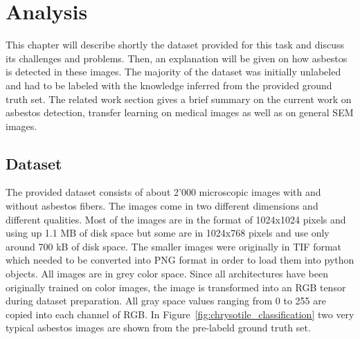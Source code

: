 \chapter{Analysis}

This chapter will describe shortly the dataset provided for this task and discuss its challenges and problems. Then, an explanation will be given on how asbestos is detected in these images. The majority of the dataset was initially unlabeled and had to be labeled with the knowledge inferred from the provided ground truth set. The related work section gives a brief summary on the current work on asbestos detection, transfer learning on medical images as well as on general SEM images.

\section{Dataset}


The provided dataset consists of about 2'000 microscopic images with and without asbestos fibers. The images come in two different dimensions and different qualities. Most of the images are in the format of 1024x1024 pixels and using up 1.1 MB of disk space but some are in 1024x768 pixels and use only around 700 kB of disk space. The smaller images were originally in TIF format which needed to be converted into PNG format in order to load them into python objects. All images are in grey color space. Since all architectures have been originally trained on color images, the image is transformed into an RGB tensor during dataset preparation. All gray space values ranging from 0 to 255 are copied into each channel of RGB. In Figure~\ref{fig:chrysotile_classification} two very typical asbestos images are shown from the pre-labeld ground truth set.

